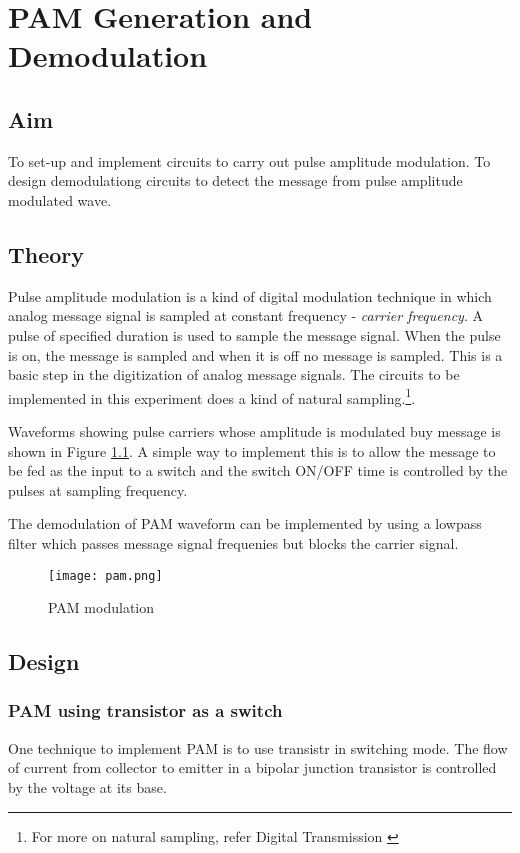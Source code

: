 \chapter[PAM Generation and Demodulation]{PAM Generation and Demodulation}

\section*{Aim}
To set-up and implement circuits to carry out pulse amplitude modulation. To design demodulationg circuits to detect the message from pulse amplitude modulated wave.
\section*{Theory}
Pulse amplitude modulation is a kind of digital modulation technique in which analog message signal is sampled at constant frequency - \emph{carrier frequency}. A pulse of specified duration is used to sample the message signal. When the pulse is on, the message is sampled and when it is off no message is sampled. This is a basic step in the digitization of analog message signals. The circuits to be implemented in this experiment does a kind of natural sampling.\footnote{For more on natural sampling, refer Digital Transmission \cite{Tomasi}}.

Waveforms showing pulse carriers whose amplitude is modulated buy message is shown in Figure \ref{PAMmod}. A simple way to implement this is to allow the message to be fed as the input to a switch and the switch ON/OFF time is controlled by the pulses at sampling frequency.

The demodulation of PAM waveform can be implemented by using a lowpass filter which passes message signal frequenies but blocks the carrier signal.
\begin{figure}[h]
\texttt{[image: pam.png]}
\caption{PAM modulation}
\label{PAMmod}
\end{figure}
\section*{Design}
\subsection*{PAM using transistor as a switch}
One technique to implement PAM is to use transistr in switching mode. The flow of current from collector to emitter in a bipolar junction transistor is controlled by the voltage at its base. 

